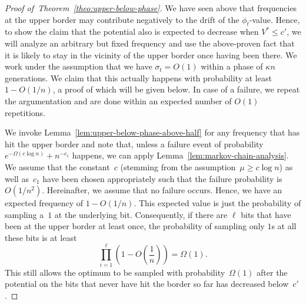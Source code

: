 \documentclass[11pt, a4paper]{article}
\newenvironment{proofof}[1]{\begin{proof}[Proof of~#1]}{\end{proof}}
\begin{document}
\begin{proofof}{Theorem~\ref{theo:upper-below-phase}}
 

We have 
seen above that frequencies at the upper border may contribute negatively to the drift of the $\phi_t$-value. 
Hence, to show the claim that the potential also is expected to decrease when $V^*\le c'$, 
we will analyze an arbitrary but fixed 
frequency and use the above-proven fact that 
it is likely to stay in the vicinity of the upper border once 
having been there. We work under the assumption that we have  
$\sigma_t=O(1)$ within a phase of $\kappa n$ generations. We claim that this actually happens with 
probability at least~$1-O(1/n)$, a proof of which will be given below. In case of a failure, we repeat 
the argumentation and are done within an expected number of $O(1)$ repetitions.

We invoke Lemma~\ref{lem:upper-below-phase-above-half} for any frequency that has hit the upper border   
and note that, unless a failure event of probability $e^{-\Omega(c\log n)}+n^{-c_1}$ 
happens, we can apply Lemma~\ref{lem:markov-chain-analysis}. We assume that the constant~$c$ 
(stemming from  the assumption~$\mu\ge c\log n$) as well as~$c_1$ 
have been chosen appropriately such that the failure probability is $O(1/n^2)$. Hereinafter, we 
assume that no failure occurs. 
Hence, we have an expected frequency of $1-O(1/n)$. This expected value is 
just the probability of sampling a~$1$ at the underlying bit. 
 Consequently, if there are $\ell$ bits 
that have been at the upper border at least once, the probability of sampling only $1$s at all these 
bits is at least \[\prod_{i=1}^\ell \left(1-O\left(\frac{1}{n}\right)\right)=\Omega(1).\] 
This still allows the 
optimum to be sampled with probability~$\Omega(1)$ 
after the potential on the bits that never have hit the border so far has decreased below~$c'$.


\end{proofof}
\end{document}
